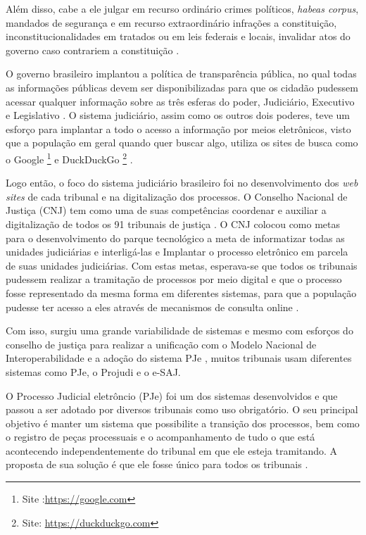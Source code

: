 Além disso, cabe a ele julgar em recurso ordinário crimes políticos, \textit{habeas corpus}, mandados de segurança e em recurso extraordinário infrações a constituição, inconstitucionalidades em tratados ou em leis federais e locais, invalidar atos do governo caso contrariem a constituição \cite{BRASIL1988}.

O governo brasileiro implantou a política de transparência pública, no qual todas as informações públicas devem ser disponibilizadas para que os cidadão pudessem acessar qualquer informação sobre as três esferas do poder, Judiciário, Executivo e Legislativo \cite{CONGRESSO2011}.
O sistema judiciário, assim como os outros dois poderes, teve um esforço para implantar a todo o acesso a informação por meios eletrônicos, visto que a população em geral quando quer buscar algo, utiliza os sites de busca como o Google \footnote{Site :\url{https://google.com}} e DuckDuckGo \footnote{Site: \url{https://duckduckgo.com}} \cite{RUSCHEL2011}.

Logo então, o foco do sistema judiciário brasileiro foi no desenvolvimento dos \textit{web sites} de cada tribunal e na digitalização dos processos. O Conselho Nacional de Justiça (CNJ) tem como uma de suas competências coordenar e auxiliar a digitalização de todos os 91 tribunais de justiça \cite{RUSCHEL2011}. O CNJ colocou como metas para o desenvolvimento do parque tecnológico a meta de informatizar todas as unidades judiciárias e interligá-las e  Implantar  o  processo  eletrônico  em  parcela  de  suas unidades judiciárias. %
Com estas metas, esperava-se que todos os tribunais pudessem realizar a tramitação de processos por meio digital \cite{CNJ2009}
e que o processo fosse representado da mesma forma em diferentes sistemas, para que a população pudesse ter acesso a eles através de mecanismos de consulta online \cite{RUSCHEL2011}.

Com isso, surgiu uma grande variabilidade de sistemas%
e mesmo com esforços do conselho de justiça para realizar a unificação com o Modelo Nacional de Interoperabilidade \cite{CNJ2009}
e a adoção do sistema PJe %
, muitos tribunais usam diferentes sistemas como PJe, o Projudi e o e-SAJ.

O Processo Judicial eletrôncio (PJe) foi um dos sistemas desenvolvidos e que passou a ser adotado por diversos tribunais como uso obrigatório. O seu principal objetivo é manter um sistema que possibilite a transição dos processos, bem como o registro de peças processuais e o acompanhamento de tudo o que está acontecendo independentemente do tribunal em que ele esteja tramitando. A proposta de sua solução é que ele fosse único para todos os tribunais \cite{PJe2018}.

